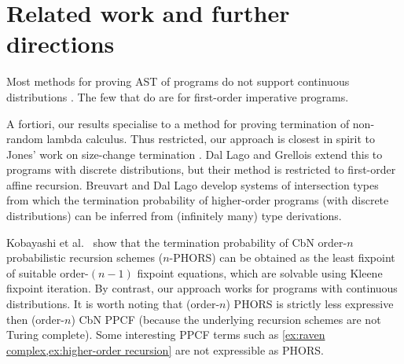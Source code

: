 \section{Related work and further directions}
\label{sec:related}

 

Most methods for proving AST of programs do not support continuous distributions \cite{DBLP:journals/toplas/LagoG19,DBLP:journals/jacm/KaminskiKMO18,DBLP:conf/lics/OlmedoKKM16,DBLP:conf/lics/KobayashiLG19,DBLP:conf/mfcs/KaminskiK15,DBLP:series/mcs/McIverM05}.
The few that do \cite{DBLP:conf/popl/FioritiH15,DBLP:conf/pldi/ChenH20,DBLP:journals/toplas/ChatterjeeFNH18} are for first-order imperative programs.

A fortiori, our results specialise to a method for proving termination of non-random lambda calculus. 
Thus restricted, our approach is closest in spirit to Jones' work on size-change termination \cite{DBLP:journals/lmcs/JonesB08,DBLP:conf/aplas/SereniJ05}. 
Dal Lago and Grellois \cite{DBLP:journals/toplas/LagoG19} extend this to programs with discrete distributions, but their method is restricted to first-order affine recursion.
Breuvart and Dal Lago \cite{DBLP:conf/ppdp/BreuvartL18} develop systems of intersection types from which the termination probability of higher-order programs (with discrete distributions) can be inferred from (infinitely many) type derivations. 

Kobayashi et al.~\cite{DBLP:conf/lics/KobayashiLG19} show that the termination probability of CbN order-$n$ probabilistic recursion schemes ($n$-PHORS) can be obtained as the least fixpoint of suitable order-$(n-1)$ fixpoint equations, which are solvable using Kleene fixpoint iteration.  
By contrast, our approach works for programs with continuous distributions. 
It is worth noting that (order-$n$) PHORS is strictly less expressive then (order-$n$) CbN PPCF (because the underlying recursion schemes are not Turing complete). 
Some interesting PPCF terms such as \cref{ex:raven complex,ex:higher-order recursion}
are not expressible as PHORS.

